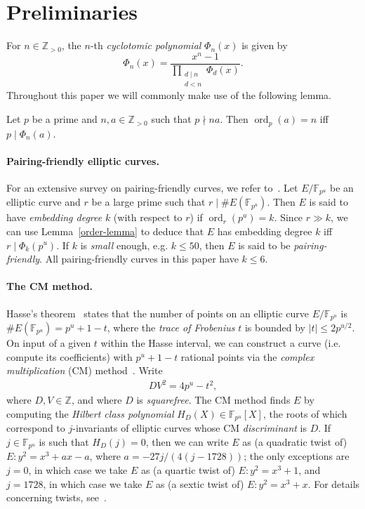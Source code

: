 \documentclass[version=preprint]{iacrcc}
\DeclareMathOperator{\ord}{ord}
\newcommand{\Z}{\mathbb{Z}}
\newcommand{\F}{\mathbb{F}}
\begin{document}
\section{Preliminaries}\label{sec:prelims}

For $n \in \Z_{>0}$, the $n$-th \emph{cyclotomic polynomial} $\Phi_n(x)$ is given by 
\[\Phi_n(x) = \dfrac{x^n-1}{\prod_{\substack{d\mid n \\ d<n}}\Phi_d(x)}.\]
Throughout this paper we will commonly make use of the following lemma.
\begin{lemma}\label{order-lemma}
    Let $p$ be a prime and $n,a\in \Z_{>0}$ such that $p\nmid na$. Then $\ord_p(a)=n$ iff $p\mid \Phi_n(a)$.
\end{lemma}


\paragraph{Pairing-friendly elliptic curves.} For an extensive survey on pairing-friendly curves, we refer to~\cite{taxonomy}. Let $E/\F_{p^u}$ be an elliptic curve and $r$ be a large prime such that $r \mid \#E(\F_{p^u})$. Then $E$ is said to have \emph{embedding degree} $k$ (with respect to $r$) if $\ord_r(p^u)=k$. Since $r \gg k$, we can use Lemma~\ref{order-lemma} to deduce that $E$ has embedding degree $k$ iff $r \mid \Phi_k(p^u)$. If $k$ is \emph{small} enough, e.g. $k \leq 50$, then $E$ is said to be \emph{pairing-friendly}. All pairing-friendly curves in this paper have $k \leq 6$. 

\paragraph{The CM method.} Hasse's theorem~\cite{hasse1936theorie} states that the number of points on an elliptic curve $E/\F_{p^u}$ is $\#E(\F_{p^u})=p^u+1-t$, where the \emph{trace of Frobenius} $t$ is bounded by $|t| \leq 2p^{u/2}$. On input of a given $t$ within the Hasse interval, we can construct a curve (i.e. compute its coefficients) with $p^u+1-t$ rational points via the \emph{complex multiplication} (CM) method~\cite[\S 4]{Morain91}. Write 
\begin{align}\label{eq:CM}
DV^2=4p^u-t^2,
\end{align}
where $D, V \in \Z$, and where $D$ is \emph{squarefree}. The CM method finds $E$ by computing the \emph{Hilbert class polynomial} $H_{D}(X) \in \F_{p^u}[X]$, the roots of which correspond to $j$-invariants of elliptic curves whose CM \emph{discriminant} is $D$. If $j \in \F_{p^u}$ is such that $H_D(j)=0$, then we can write $E$ as (a quadratic twist of) $E \colon y^2=x^3+ax-a$, where $a=-27j/(4(j-1728))$; the only exceptions are $j=0$, in which case we take $E$ as (a quartic twist of) $E \colon y^2=x^3+1$, and $j=1728$, in which case we take $E$ as (a sextic twist of) $E \colon y^2=x^3+x$. For details concerning twists, see~\cite[Proposition X.5.4]{silverman2009arithmetic}. 
\end{document}
